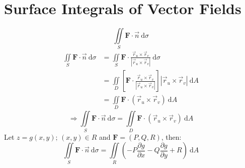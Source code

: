 \documentclass[12pt, fleqn]{book}
\newcommand{\D}{\mathrm{d}}
\begin{document}
     	\section{Surface Integrals of Vector Fields}
     		\begin{equation}
     			\iint\limits_S \mathbf{F} \cdot \vec{n} \ \D \sigma
     		\end{equation}
     		\begin{equation*}
     			\begin{split}
     				\iint\limits_S \mathbf{F} \cdot \vec{n} \ \D \sigma
     				&  = \iint\limits_S \mathbf{F} \cdot \frac{\vec{r}_u \times \vec{r}_v}{\left|\vec{r}_u \times \vec{r}_v\right|} \ \D \sigma \\
     				& = \iint\limits_D \left[\mathbf{F} \cdot \frac{\vec{r}_u \times \vec{r}_v}{\left|\vec{r}_u \times \vec{r}_v\right|}\right] \left|\vec{r}_u \times \vec{r}_v\right| \ \D A \\
     				& = \iint\limits_D \mathbf{F} \cdot \left(\vec{r}_u \times \vec{r}_v\right) \ \D A
     			\end{split}
     		\end{equation*}
     	    \begin{equation}
     	    	\Rightarrow 
     	    	\iint\limits_S \mathbf{F} \cdot \vec{n} \ \D \sigma = \iint\limits_D \mathbf{F} \cdot \left(\vec{r}_u \times \vec{r}_v\right) \ \D A
     	    \end{equation}
     		Let $z = g(x, y); \, (x, y) \in R$ and $\mathbf{F} = (P, Q, R)$, then:
     		\begin{equation}
     			\iint\limits_S \mathbf{F} \cdot \vec{n} \ \D \sigma = 
     			\iint\limits_R \left(-P \frac{\partial g}{\partial x} - Q\frac{\partial g}{\partial y} + R\right) \ \D A
     		\end{equation}
     	
     	
     	
     	
     	
     	
     	
     	
     	
     	
     	
     	
     	
     	
     	
     	
     	
     	
     	
     	
     	
     	
     	
     	
     	
     	
     	
     	
     	
     	
     	
     	
     	
     	
     	
     	
     	
     	
\end{document}
